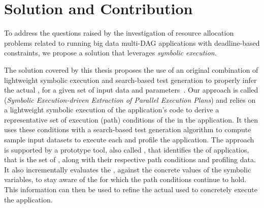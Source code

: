 \section{Solution and Contribution}\label{sec:solution_contribution}
To address the questions raised by the investigation of resource allocation problems related to running big data multi-DAG applications with deadline-based \qos constraints, we propose a solution that leverages \textit{symbolic execution}. 





The solution covered by this thesis proposes the use of an original combination of lightweight symbolic execution and search-based test generation to properly infer the actual \plan, for a given set of input data and parameters~\cite{Baresi-Quattrocchi-Denaro:2019}. Our approach is called \dSymb (\textit{Symbolic Execution-driven Extraction of Parallel Execution Plans}) and relies on a lightweight symbolic execution of the application's code to derive a representative set of execution (path) conditions of the \plans in the application. It then uses these conditions with a search-based test generation algorithm to compute sample input datasets to execute each \plan and profile the application. The approach is supported by a prototype tool, also called \dSymb, that identifies the \model of applicatios, that is the set of \plans, along with their respective path conditions and profiling data. It also incrementally evaluates the \model, against the  concrete values of the symbolic variables, to stay aware of the \plans for which the path conditions continue to hold. This information can then be used to refine the actual \plan used to concretely execute the application. 


